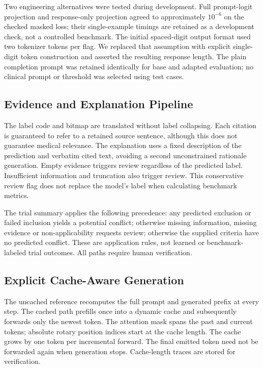 \documentclass[conference]{IEEEtran}
\begin{document}
Two engineering alternatives were tested during development. Full prompt-logit projection and response-only projection agreed to approximately $10^{-6}$ on the checked masked loss; their single-example timings are retained as a development check, not a controlled benchmark. The initial spaced-digit output format used two tokenizer tokens per flag. We replaced that assumption with explicit single-digit token construction and asserted the resulting response length. The plain completion prompt was retained identically for base and adapted evaluation; no clinical prompt or threshold was selected using test cases.

\subsection{Evidence and Explanation Pipeline}
The label code and bitmap are translated without label collapsing. Each citation is guaranteed to refer to a retained source sentence, although this does not guarantee medical relevance. The explanation uses a fixed description of the prediction and verbatim cited text, avoiding a second unconstrained rationale generation. Empty evidence triggers review regardless of the predicted label. Insufficient information and truncation also trigger review. This conservative review flag does not replace the model's label when calculating benchmark metrics.

The trial summary applies the following precedence: any predicted exclusion or failed inclusion yields a potential conflict; otherwise missing information, missing evidence or non-applicability requests review; otherwise the supplied criteria have no predicted conflict. These are application rules, not learned or benchmark-labeled trial outcomes. All paths require human verification.

\subsection{Explicit Cache-Aware Generation}
The uncached reference recomputes the full prompt and generated prefix at every step. The cached path prefills once into a dynamic cache and subsequently forwards only the newest token. The attention mask spans the past and current tokens; absolute rotary position indices start at the cache length. The cache grows by one token per incremental forward. The final emitted token need not be forwarded again when generation stops. Cache-length traces are stored for verification.
\end{document}
